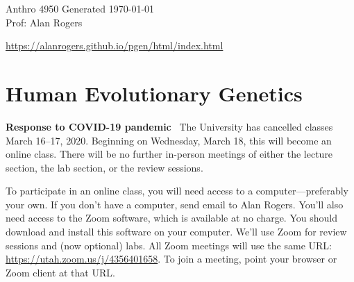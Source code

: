\documentclass[11pt]{article}
\newcommand{\heading}[1]{\bigskip\noindent\textbf{#1}~}
\begin{document}
\begin{flushleft}
Anthro 4950     \hfill  Generated \today\\
Prof: Alan Rogers\\
\end{flushleft}
\begin{center}
  \url{https://alanrogers.github.io/pgen/html/index.html}
\end{center}

\section*{\centering Human Evolutionary Genetics}

\heading{Response to COVID-19 pandemic} The University has cancelled
classes March 16--17, 2020. Beginning on Wednesday, March 18, this
will become an online class. There will be no further in-person
meetings of either the lecture section, the lab section, or the review
sessions.

To participate in an online class, you will need access to a
computer---preferably your own. If you don't have a computer, send
email to Alan Rogers. You'll also need access to the Zoom software,
which is available at no charge. You should download and install this
software on your computer. We'll use Zoom for review sessions and (now
optional) labs. All Zoom meetings will use the same URL:
\url{https://utah.zoom.us/j/4356401658}. To join a meeting, point your
browser or Zoom client at that URL.
\end{document}
